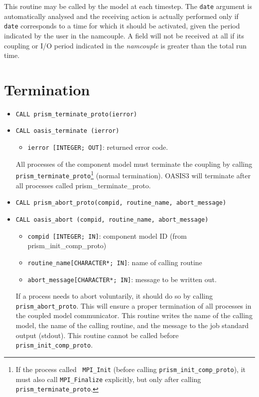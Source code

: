 This routine may be called by the model at each timestep. The {\tt date}
argument is automatically analysed and the receiving action is actually
performed only if {\tt date} corresponds to a time for which it should
be activated, given the period indicated by the user in the
namcouple. A field will not be received at all if its
coupling or I/O period indicated in the {\it namcouple} is greater
than the total run time.

\section{Termination}
\label{subsubsec_Termination}

\begin{itemize}

\item {\tt CALL prism\_terminate\_proto(ierror)}
\item {\tt CALL oasis\_terminate       (ierror)}
  \begin{itemize}
  \item {\tt ierror [INTEGER; OUT]}: returned error code.
  \end{itemize}
  All processes of the component model must terminate the coupling by calling {\tt
  prism\_terminate\_proto}\footnote{If the process called {\tt
  MPI\_Init} (before calling {\tt prism\_init\_comp\_proto}), it must
  also call {\tt MPI\_Finalize} explicitly, but only after calling
  {\tt prism\_terminate\_proto}.} (normal termination). OASIS3 will
  terminate after all processes called
  prism\_terminate\_proto.

\item {\tt CALL prism\_abort\_proto(compid, routine\_name, abort\_message)}
\item {\tt CALL oasis\_abort       (compid, routine\_name, abort\_message)}
\begin{itemize}
  \item {\tt compid [INTEGER; IN]}: component model ID (from
prism\_init\_comp\_proto) 
  \item {\tt routine\_name[CHARACTER*; IN]}: name of calling routine
  \item {\tt abort\_message[CHARACTER*; IN]}: message to be written out.
\end{itemize}

 If a process needs to abort voluntarily, it should do so by
 calling {\tt prism\_abort\_proto}. This will ensure a proper
 termination of all processes in the coupled model communicator. This
 routine writes the name of the calling model, the name of the
 calling routine, and the message to the job standard output (stdout). 
 This routine cannot be called before {\tt prism\_init\_comp\_proto}.

\end{itemize}

